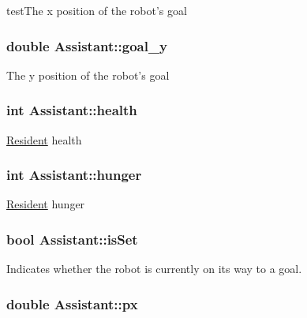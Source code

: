 test\-The x position of the robot's goal \hypertarget{classAssistant_a1b6ce5d7c3124140be8d351c847fe91c}{
\subsubsection[{goal\-\_\-y}]{\setlength{\rightskip}{0pt plus 5cm}double Assistant\-::goal\-\_\-y\hspace{0.3cm}{\ttfamily [protected]}}}\label{classAssistant_a1b6ce5d7c3124140be8d351c847fe91c}
The y position of the robot's goal \hypertarget{classAssistant_a13877ed73a684f59171c686186110870}{
\subsubsection[{health}]{\setlength{\rightskip}{0pt plus 5cm}int Assistant\-::health\hspace{0.3cm}{\ttfamily [protected]}}}\label{classAssistant_a13877ed73a684f59171c686186110870}
\hyperlink{classResident}{Resident} health \hypertarget{classAssistant_ad109fd18cc762f9b9f7e64b626ec5d48}{
\subsubsection[{hunger}]{\setlength{\rightskip}{0pt plus 5cm}int Assistant\-::hunger\hspace{0.3cm}{\ttfamily [protected]}}}\label{classAssistant_ad109fd18cc762f9b9f7e64b626ec5d48}
\hyperlink{classResident}{Resident} hunger \hypertarget{classAssistant_a939484adfb9673d2608282124ef348b9}{
\subsubsection[{is\-Set}]{\setlength{\rightskip}{0pt plus 5cm}bool Assistant\-::is\-Set\hspace{0.3cm}{\ttfamily [protected]}}}\label{classAssistant_a939484adfb9673d2608282124ef348b9}
Indicates whether the robot is currently on its way to a goal. \hypertarget{classAssistant_a694fdaa5fb378340c42b7f75716cd1ce}{
\subsubsection[{px}]{\setlength{\rightskip}{0pt plus 5cm}double Assistant\-::px\hspace{0.3cm}{\ttfamily [protected]}}}\label{classAssistant_a694fdaa5fb378340c42b7f75716cd1ce}
